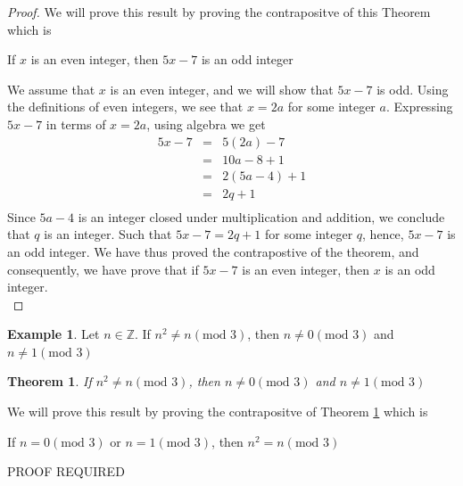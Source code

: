 \documentclass{book}
\newtheorem{theorem}{Theorem}[section]
\theoremstyle{definition}
\newtheorem{example}{Example}[definition]
\theoremstyle{remark}
\newcommand{\bb}[1]{\mathbb{#1}}
\begin{document}
\begin{proof}
We will prove this result by proving the contrapositve of this Theorem which is
	\begin{center}
		If $x$ is an even integer, then $5x - 7$ is an odd integer
	\end{center}

We assume that $x$ is an even integer, and we will show that $5x - 7$ is odd. Using the definitions of even integers, we see that $x = 2a$ for some integer $a$. Expressing $5x - 7$ in terms of $x = 2a$, using algebra we get
	\begin{eqnarray*}
		5x - 7 & = & 5(2a) - 7  \nonumber \\
		& = & 10a - 8 + 1 \nonumber \\
		& = & 2(5a - 4) + 1 \nonumber \\
		& = & 2q + 1 \nonumber \\
	\end{eqnarray*}
Since $5a - 4$ is an integer closed under multiplication and addition, we conclude that $q$ is an integer. Such that $5x - 7 = 2q + 1$ for some integer $q$, hence, $5x - 7$ is an odd integer. We have thus proved the contrapostive of the theorem, and consequently, we have prove that if $5x - 7$ is an even integer, then $x$ is an odd integer. \\
\end{proof}


















\begin{example}
Let $n \in \bb{Z}$. If $n^2 \neq n (\text{mod 3})$, then $n \neq 0 (\text{mod 3})$ and $n \neq 1 (\text{mod 3})$

\begin{tcolorbox}
	\begin{theorem}
	\label{the3}
		If $n^2 \neq n (\text{mod 3})$, then $n \neq 0 (\text{mod 3})$ and $n \neq 1 (\text{mod 3})$
	\end{theorem}
\end{tcolorbox}

We will prove this result by proving the contrapositve of Theorem \ref{the3} which is
	\begin{center}
		If $n = 0 (\text{mod 3})$ or $n = 1 (\text{mod 3})$, then $n^2 = n (\text{mod 3})$
	\end{center}
PROOF REQUIRED

\end{example}
\end{document}
